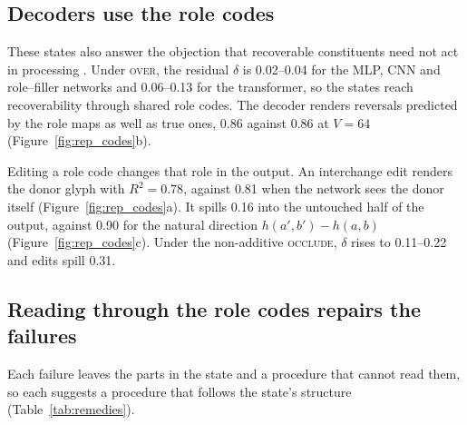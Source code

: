 \documentclass[10pt]{article}
\theoremstyle{plain}
\theoremstyle{remark}
\begin{document}
\subsection{Decoders use the role codes}
\label{sec:structure}

These states also answer the objection that recoverable constituents need not act in processing \citep{fodor1990}. Under \textsc{over}, the residual $\delta$ is 0.02--0.04 for the MLP, CNN and role--filler networks and 0.06--0.13 for the transformer, so the states reach recoverability through shared role codes. The decoder renders reversals predicted by the role maps as well as true ones, 0.86 against 0.86 at $V = 64$ (Figure~\ref{fig:rep_codes}b).

Editing a role code changes that role in the output. An interchange edit renders the donor glyph with $R^2 = 0.78$, against 0.81 when the network sees the donor itself (Figure~\ref{fig:rep_codes}a). It spills 0.16 into the untouched half of the output, against 0.90 for the natural direction $h(a', b') - h(a, b)$ (Figure~\ref{fig:rep_codes}c). Under the non-additive \textsc{occlude}, $\delta$ rises to 0.11--0.22 and edits spill 0.31.

\subsection{Reading through the role codes repairs the failures}
\label{sec:remedies}

Each failure leaves the parts in the state and a procedure that cannot read them, so each suggests a procedure that follows the state's structure (Table~\ref{tab:remedies}).
\end{document}
